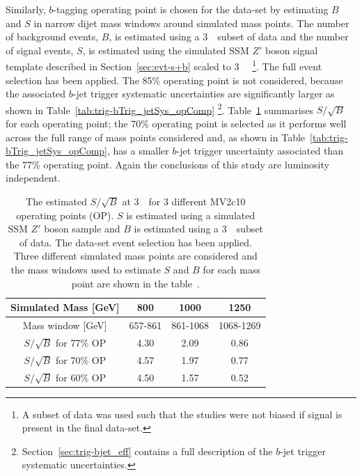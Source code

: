 Similarly, $b$-tagging operating point is chosen for the \lm{} data-set
by estimating $B$ and $S$ in narrow dijet mass windows around simulated mass points.
The number of background events, $B$, is estimated  using a
3~\ifb~subset of \lm{} data and 
the number of signal events, $S$, is estimated using the simulated SSM $Z'$ boson signal template
described in Section~\ref{sec:evt-s+b} scaled to 3~\ifb~
\footnote{A subset of data was used such that the studies were not biased if signal is present in the final data-set.}.
The full \lm{} event selection has been applied.
The 85\% operating point is not considered,
because the associated $b$-jet trigger systematic uncertainties
are significantly larger as shown in Table~\ref{tab:trig-bTrig_jetSys_opComp}
\footnote{Section~\ref{sec:trig-bjet_eff} contains a full description of the $b$-jet trigger systematic uncertainties.}.
Table~\ref{tab:evt-btag_lm} summarises $S/\sqrt{B}$ for each operating point;
the 70\% operating point is selected as it performs well across the full range of mass points considered
and, as shown in Table~\ref{tab:trig-bTrig_jetSys_opComp}, has a smaller $b$-jet trigger uncertainty associated than the 77\% operating point.
Again the conclusions of this study are luminosity independent.

\vspace{-0.4em}
\begin{table}[ht]
\begin{center}
\begin{tabular}{|c||c|c|c|}
  \hline
  Simulated Mass [GeV]            &   800       &  1000       & 1250\\
  \hline
  Mass window [GeV]               &  657-861    &  861-1068   & 1068-1269 \\
  \hline
  $S/\sqrt{B}$ for 77\% OP        &  4.30       &  2.09       & 0.86     \\
  $S/\sqrt{B}$ for 70\% OP        &  4.57       &  1.97       & 0.77     \\
  $S/\sqrt{B}$ for 60\% OP        &  4.50       &  1.57       & 0.52     \\
  \hline
\end{tabular}
\caption[The estimated $S/\sqrt{B}$ at 3~\ifb~for 3 different MV2c10 operating points (OP).
  $S$ is estimated using a simulated SSM $Z'$ boson sample and $B$ is estimated using a 3~\ifb~subset of data.
  The \lm{} data-set event selection has been applied.
  Three different simulated mass points are considered and the mass windows used
  to estimate $S$ and $B$ for each mass point are shown in the table.]
        {The estimated $S/\sqrt{B}$ at 3~\ifb~for 3 different MV2c10 operating points (OP).
          $S$ is estimated using a simulated SSM $Z'$ boson sample and $B$ is estimated using a 3~\ifb~subset of data.
          The \lm{} data-set event selection has been applied.
          Three different simulated mass points are considered and the mass windows used
          to estimate $S$ and $B$ for each mass point are shown in the table~\cite{dibjet-full_int}.}
\vspace{-2em}
\label{tab:evt-btag_lm}
\end{center}
\end{table}


